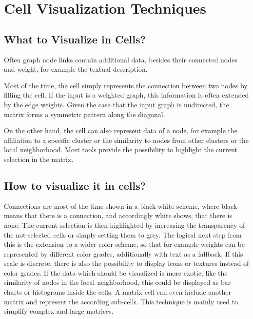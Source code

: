 %
%
% 
% 
% 


\chapter{Cell Visualization Techniques}\label{chap:celltypes}


\section{What to Visualize in Cells?}
Often graph node links contain additional data, besides their connected nodes and weight, for example the textual description.

Most of the time, the cell simply represents the connection between two nodes by filling the cell. If the input is a weighted graph, this information is often extended by the edge weights. Given the case that the input graph is undirected, the matrix forms a symmetric pattern along the diagonal. 

On the other hand, the cell can also represent data of a node, for example the affiliation to a specific cluster or the similarity to nodes from other clusters or the local neighborhood. 
Most tools provide the possibility to highlight the current selection in the matrix.

\section{How to visualize it in cells?}

Connections are most of the time shown in a black-white scheme, where black means that there is a connection, and accordingly white shows, that there is none. The current selection is then highlighted by increasing the transparency of the not-selected cells or simply setting them to grey. The logical next step from this is the extension to a wider color scheme, so that for example weights can be represented by different color grades, additionally with text as a fallback. If this scale is discrete, there is also the possibility to display icons or textures instead of color grades.
If the data which should be visualized is more exotic, like the similarity of nodes in the local neighborhood, this could be displayed as bar charts or histograms inside the cells. A matrix cell can even include another matrix and represent the according sub-cells. This technique is mainly used to simplify complex and large matrices.


